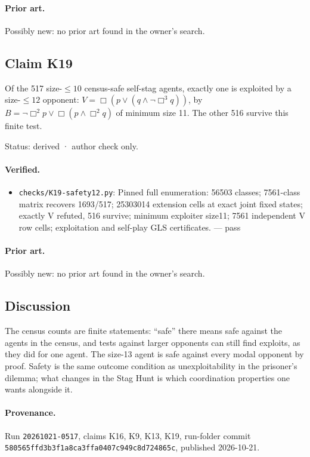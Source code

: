 \documentclass{article}
\begin{document}
\paragraph{Prior art.} Possibly new: no prior art found in the owner's search.

\subsection*{Claim K19}

Of the 517 size-$\le10$ census-safe self-stag agents, exactly one is exploited by a size-$\le12$ opponent: $V=\Box(p\lor(q\land\neg\Box^3q))$, by $B=\neg\Box^2p\lor\Box(p\land\Box^2q)$ of minimum size 11. The other 516 survive this finite test.

Status: derived · author check only.

\paragraph{Verified.}
\begin{itemize}
\item \texttt{checks/K19-safety12.py}: Pinned full enumeration: 56503 classes; 7561-class matrix recovers 1693/517; 25303014 extension cells at exact joint fixed states; exactly V refuted, 516 survive; minimum exploiter size11; 7561 independent V row cells; exploitation and self-play GLS certificates. --- pass
\end{itemize}

\paragraph{Prior art.} Possibly new: no prior art found in the owner's search.

\subsection*{Discussion}

The census counts are finite statements: ``safe'' there means safe against the agents in the census,
and tests against larger opponents can still find exploits, as they did for one agent.
The size-13 agent is safe against every modal opponent by proof. Safety is the same outcome
condition as unexploitability in the prisoner's dilemma; what changes in the Stag Hunt is which
coordination properties one wants alongside it.

\paragraph{Provenance.}
Run \texttt{20261021-0517}, claims K16, K9, K13, K19, run-folder commit \texttt{580565ffd3b3f1a8ca3ffa0407c949c8d724865c}, published 2026-10-21.
\end{document}
